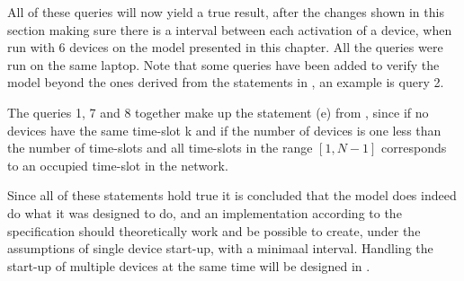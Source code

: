 \noindent
All of these queries will now yield a true result, after the changes shown in this section making sure there is a interval between each activation of a device, when run with 6 devices on the model presented in this chapter.
All the queries were run on the same laptop.
Note that some queries have been added to verify the model beyond the ones derived from the statements in , an example is query 2.

The queries 1, 7 and 8 together make up the statement (e) from , since if no devices have the same time-slot k and if the number of devices is one less than the number of time-slots and all time-slots in the range $[1, N-1]$ corresponds to an occupied time-slot in the network.

Since all of these statements hold true it is concluded that the model does indeed do what it was designed to do, and an implementation according to the specification should theoretically work and be possible to create, under the assumptions of single device start-up, with a minimaal interval.
Handling the start-up of multiple devices at the same time will be designed in .
\newpage
